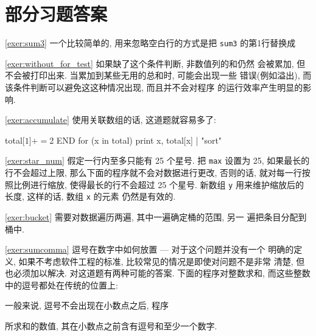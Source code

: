 \chapter{部分习题答案}
\label{chap:answers_to_selected_exercises}

\myexer\ref{exer:sum3} 一个比较简单的, 用来忽略空白行的方式是把 \texttt{sum3}
的第1行替换成
\begin{awkcode}
        nfld == 0 && NF > 0 { nfld = NF
\end{awkcode}

\myexer\ref{exer:without_for_test} 如果缺了这个条件判断, 非数值列的和仍然
    会被累加, 但不会被打印出来. 当累加到某些无用的总和时, 可能会出现一些
    错误(例如溢出), 而该条件判断可以避免这这种情况出现, 而且并不会对程序
    的运行效率产生明显的影响.

\myexer\ref{exer:accumulate} 使用关联数组的话, 这道题就容易多了:
\begin{awkcode}
        { total[$1] += $2 }
    END { for (x in total) print x, total[x] | "sort" }
\end{awkcode}

\myexer\ref{exer:star_num} 假定一行内至多只能有 25 个星号. 把 \texttt{max} 
设置为 25, 如果最长的行不会超过上限, 那么下面的程序就不会对数据进行更改,
    否则的话, 就对每一行按照比例进行缩放, 使得最长的行不会超过 25 个星号.
新数组 \texttt{y} 用来维护缩放后的长度, 这样的话, 数组 \texttt{x} 的元素
仍然是有效的.

\myexer\ref{exer:bucket} 需要对数据遍历两遍, 其中一遍确定桶的范围, 另一 
    遍把条目分配到桶中.
    
\myexer\ref{exer:sumcomma} 逗号在数字中如何放置 --- 对于这个问题并没有一个
明确的定义, 如果不考虑软件工程的标准, 比较常见的情况是即使对问题不是非常
清楚, 但也必须加以解决. 对这道题有两种可能的答案. 下面的程序对整数求和,
而这些整数中的逗号都处在传统的位置上:
一般来说, 逗号不会出现在小数点之后, 程序 
所求和的数值, 其在小数点之前含有逗号和至少一个数字.

